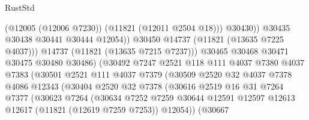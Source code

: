 \begin{lexlean}{RustStd}
\begin{coremodule}
                                          (@12005 (@12006 @7230))
                                          (@11821 (@12011 @2504 @18)))
                                        @30430))
                                    @30435
                                    @30438
                                    @30441
                                    @30444
                                    @12054))
                                @30450
                                @14737
                                (@11821 (@13635 @7225 @4037)))
                              @14737
                              (@11821 (@13635 @7215 @7237)))
                            @30465
                            @30468
                            @30471
                            @30475
                            @30480
                            @30486)
                          (@30492
                            @7247
                            @2521
                            @118
                            @111
                            @4037
                            @7380
                            @4037
                            @7383
                            (@30501
                              @2521
                              @111
                              @4037
                              @7379
                              (@30509
                                @2520
                                @32
                                @4037
                                @7378
                                @4086
                                @12343
                                (@30404
                                  @2520
                                  @32
                                  @7378
                                  (@30616
                                    @2519
                                    @16
                                    @31
                                    @7264
                                    @7377
                                    (@30623
                                      @7264
                                      (@30634
                                        @7252
                                        @7259
                                        @30644
                                        @12591
                                        @12597
                                        @12613
                                        @12617
                                        (@11821 (@12619 @7259 @7253))
                                        @12054))
                                    (@30667

\end{coremodule}
\end{lexlean}
